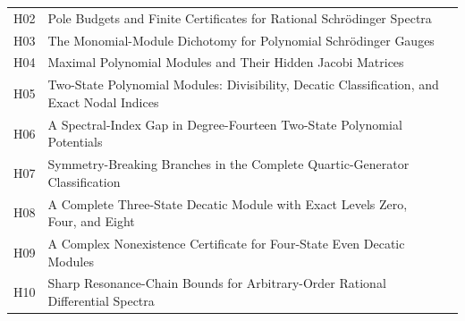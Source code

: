 \documentclass[11pt,a4paper]{article}
\theoremstyle{definition}\newtheorem{definition}[theorem]{Definition}
\theoremstyle{remark}\newtheorem{remark}[theorem]{Remark}
\numberwithin{equation}{section}
\begin{document}
\begin{longtable}{@{}p{}p{}r@{}}
H02 & Pole Budgets and Finite Certificates for Rational Schr\"odinger Spectra & \pageref{contrib-H02}\\

H03 & The Monomial-Module Dichotomy for Polynomial Schr\"odinger Gauges & \pageref{contrib-H03}\\

H04 & Maximal Polynomial Modules and Their Hidden Jacobi Matrices & \pageref{contrib-H04}\\

H05 & Two-State Polynomial Modules: Divisibility, Decatic Classification, and Exact Nodal Indices & \pageref{contrib-H05}\\

H06 & A Spectral-Index Gap in Degree-Fourteen Two-State Polynomial Potentials & \pageref{contrib-H06}\\

H07 & Symmetry-Breaking Branches in the Complete Quartic-Generator Classification & \pageref{contrib-H07}\\

H08 & A Complete Three-State Decatic Module with Exact Levels Zero, Four, and Eight & \pageref{contrib-H08}\\

H09 & A Complex Nonexistence Certificate for Four-State Even Decatic Modules & \pageref{contrib-H09}\\

H10 & Sharp Resonance-Chain Bounds for Arbitrary-Order Rational Differential Spectra & \pageref{contrib-H10}\\

\bottomrule\end{longtable}
\end{document}
